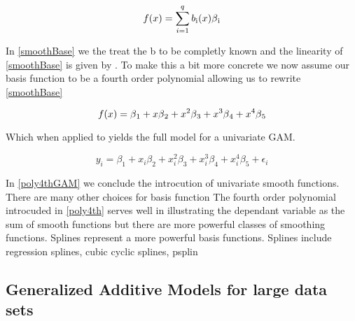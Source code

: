 \documentclass{article}
\begin{document}
    \begin{equation} \label{smoothBase} f(x) = \sum_{i=1}^{q} b\textsubscript{i} (x) \beta \textsubscript{i} \end{equation}

    In \ref{smoothBase} we the treat the b to be completly known and the linearity of \ref{smoothBase} is given by \textbeta. To make this a bit more concrete we now assume our basis function to be a fourth order polynomial allowing us to rewrite \ref{smoothBase}

    \begin{equation} \label{poly4th} f(x) = \beta \textsubscript{1} + x\beta \textsubscript{2} + x^2\beta \textsubscript{3} + x^3\beta \textsubscript{4} + x^4\beta \textsubscript{5}  \end{equation}

    Which when applied to \label{univariateSmooth} yields the full model for a univariate GAM.

    \begin{equation} \label{poly4thGAM}  y_i = \beta_1 + x_i\beta_2 + x_i^2\beta_3+ x_i^3\beta_4 + x_i^4\beta_5 + \epsilon_i \end{equation}

    In \ref{poly4thGAM} we conclude the introcution of univariate smooth functions.  There are many other choices for basis function  The fourth order polynomial introcuded in \ref{poly4th} serves well in illustrating the dependant variable as the sum of smooth functions but there are more powerful classes of smoothing functions. Splines represent a more powerful basis functions. Splines include regression splines, cubic cyclic splines, psplin



    \subsection{Generalized Additive Models for large data sets}
    \cite{GAM}
\end{document}
